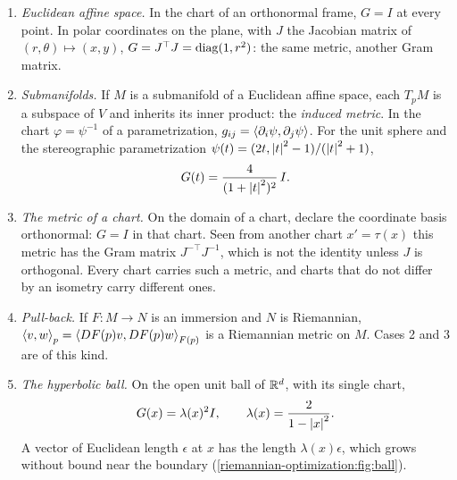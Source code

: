 \begin{notechapter}
\begin{example}\label{riemannian-optimization:ex:metrics}
\begin{enumerate}[nosep]
  \item \emph{Euclidean affine space.} In the chart of an orthonormal
        frame, $G = I$ at every point. In polar coordinates on the plane,
        with $J$ the Jacobian matrix of $(r, \theta)\mapsto(x, y)$,
        $G = J^\top J = \operatorname{diag}(1, r^2)$: the same metric, another Gram
        matrix.
  \item \emph{Submanifolds.} If $M$ is a submanifold of a Euclidean
        affine space, each $T_pM$ is a subspace of $V$ and inherits its
        inner product: the \emph{induced metric}. In the chart
        $\varphi = \psi^{-1}$ of a parametrization,
        $g_{ij} = \left\langle \partial_i\psi, \partial_j\psi \right\rangle$. For the unit
        sphere and the stereographic parametrization
        $\psi(t) = (2t, \left|t\right|^2 - 1)/(\left|t\right|^2 + 1)$,
        \[
          G(t) = \frac4{(1 + \left|t\right|^2)^2}\,I .
        \]
  \item \emph{The metric of a chart.} On the domain of a chart, declare
        the coordinate basis orthonormal: $G = I$ in that chart. Seen
        from another chart $x' = \tau(x)$ this metric has the Gram matrix
        $J^{-\top}J^{-1}$, which is not the identity unless $J$ is
        orthogonal. Every chart carries such a metric, and charts that
        do not differ by an isometry carry different ones.
  \item \emph{Pull-back.} If $F:M\to N$ is an immersion and $N$ is
        Riemannian, $\left\langle v, w \right\rangle_p = \left\langle DF(p)v, DF(p)w \right\rangle_{F(p)}$ is a
        Riemannian metric on $M$. Cases 2 and 3 are of this kind.
  \item \emph{The hyperbolic ball.} On the open unit ball of $\mathbb{R}^d$, with
        its single chart,
        \[
          G(x) = \lambda(x)^2I , \qquad
          \lambda(x) = \frac2{1 - \left|x\right|^2} .
        \]
        A vector of Euclidean length $\epsilon$ at $x$ has the length
        $\lambda(x)\epsilon$, which grows without bound near the boundary
        (\cref{riemannian-optimization:fig:ball}).
\end{enumerate}
\end{example}


\end{notechapter}
